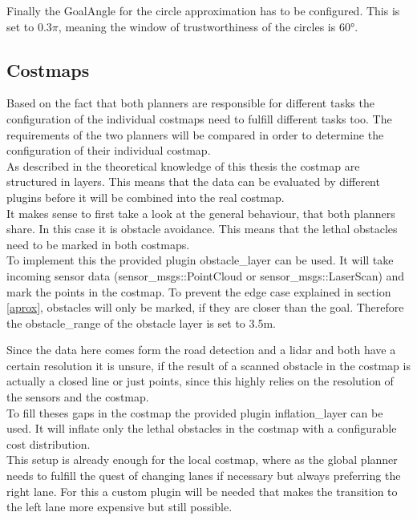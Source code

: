 Finally the GoalAngle for the circle approximation has to be configured. This is set to $0.3\pi$, meaning the window of trustworthiness of the circles is 60°.




\subsection{Costmaps}
Based on the fact that both planners are responsible for different tasks the configuration of the individual costmaps need to fulfill different tasks too. The requirements of the two planners will be compared in order to determine the configuration of their individual costmap.\\

As described in the theoretical knowledge of this thesis the costmap are structured in layers. This means that the data can be evaluated by different plugins before it will be combined into the real costmap.\\

It makes sense to first take a look at the general behaviour, that both planners share. In this case it is obstacle avoidance. This means that the lethal obstacles need to be marked in both costmaps.\\

To implement this the provided plugin obstacle\_layer can be used. It will take incoming sensor data (sensor\_msgs::PointCloud or sensor\_msgs::LaserScan) and mark the points in the costmap. To prevent the edge case explained in section \ref{aprox}, obstacles will only be marked, if they are closer than the goal. Therefore the obstacle\_range of the obstacle layer is set to 3.5m.

Since the data here comes form the road detection and a lidar and both have a certain resolution it is unsure, if the result of a scanned obstacle in the costmap is actually a closed line or just points, since this highly relies on the resolution of the sensors and the costmap.\\

To fill theses gaps in the costmap the provided plugin inflation\_layer can be used. It will inflate only the lethal obstacles in the costmap with a configurable cost distribution.\\

This setup is already enough for the local costmap, where as the global planner needs to fulfill the quest of changing lanes if necessary but always preferring the right lane. For this a custom plugin will be needed that makes the transition to the left lane more expensive but still possible.



